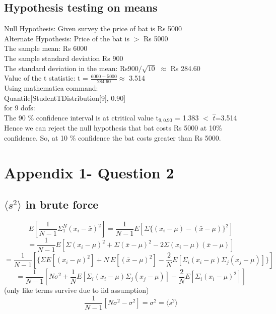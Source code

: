 \documentclass[11pt]{article}
\begin{document}
	\subsection{Hypothesis testing on means}
	
	Null Hypothesis: Given survey the price of bat is Rs 5000\-\\
	Alternate Hypothesis: Price of the bat is $>$ Rs 5000\-\\
	
	The sample mean: Rs 6000 \-\\
	The sample standard deviation Rs 900\-\\
	The standard deviation in the mean: Rs$900/\sqrt{10}$\- $\approx$ Rs 284.60\- \\  
	Value of the t statistic: t = $\frac{6000-5000}{284.60} \approx$  3.514\\
	Using mathematica command:\\
	Quantile[StudentTDistribution[9], 0.90]\\
	for 9 dofs:\\
	The 90 \% confidence interval is at ctritical value t$_{9,0.90}$ = 1.383 $<$ $\hat{t}$=3.514 \\
	 
	Hence we can reject the null hypothesis that bat costs Rs 5000\- at 10\% confidence. So, at 10 \% confidence the bat costs greater than Rs 5000\-.
	
	
	
	
	
	
	
	
	\pagebreak
	\section{\color{red} Appendix 1- Question 2}
	
	\subsection{$\langle s^2 \rangle$ in brute force}
	 
	\[
		E[\frac{1}{N-1}\Sigma_1^N (x_i - \bar{x})^2] = \frac{1}{N-1}E[\Sigma \{(x_i-\mu)-(\bar{x}-\mu)\}^2]
	\]
	\[
		 = \frac{1}{N-1}E[\Sigma (x_i-\mu)^2 +\Sigma(\bar{x}-\mu)^2 - 2 \Sigma (x_i-\mu)(\bar{x}-\mu)]
	\]
	\[
		= \frac{1}{N-1} [\{\Sigma E[(x_i-\mu)^2] + N \, E[(\bar{x}-\mu)^2] - \frac{2}{N} E[\Sigma_i (x_i-\mu)\Sigma_j( x_j-\mu)] \}]
	\]
	\[
		= \frac{1}{N-1}[N\sigma^2 + 		 \frac{1}{N}E[\Sigma_i(x_i-\mu)\Sigma_j(x_j-\mu)]-\frac{2}{N}E[\Sigma_i(x_i - \mu)^2]]
	\]
	(only like terms survive due to iid assumption)
	\[
		\frac{1}{N-1} [N\sigma^2 -\sigma^2] = \boxed{\sigma^2 = \langle s^2 \rangle}
	\]
	
\end{document}
